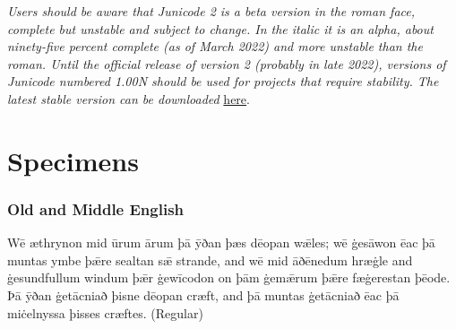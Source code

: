 \documentclass[12pt,letterpaper,openany]{book}
\begin{document}
{\textit{Users should be aware that Junicode 2 is a beta version in the roman face,
complete but unstable and subject to change. In the italic it is an alpha, about
ninety-five percent complete (as of March 2022) and more unstable than the
roman. Until the official release of version 2 (probably in late 2022), versions of Junicode
numbered \textsc{1.00N} should be used for projects that require
stability. The latest stable version can be downloaded} \href{https://github.com/psb1558/Junicode-font/releases}{here}.

}
\pagestyle{fancy}


\hypertarget{specimens}{}\chapter*{\color{RViolet}Specimens}

\subsection*{Old and Middle English}

{\noindent\regular{}Wē æthrynon mid ūrum ārum þā ȳðan þæs dēopan wǣles; wē
ġesāwon ēac þā muntas ymbe þǣre sealtan sǣ strande, and wē mid
āðēnedum hræġle and ġesundfullum windum þǣr ġewīcodon on þām
ġemǣrum þǣre fæġerestan þēode. Þā ȳðan ġetācniað þisne dēopan
cræft, and þā muntas ġetācniað ēac þā miċelnyssa þisses cræftes. (Regular)}\\

\\
\end{document}
